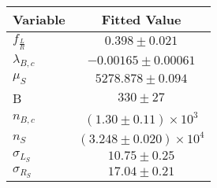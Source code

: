\begin{tabular}[t]{lc}
\hline
Variable &Fitted Value\\
\hline\hline
$f_{\frac{L}{R}}$&$0.398\pm0.021$\\
\hline
$\lambda_{B,c}$&$-0.00165\pm0.00061$\\
\hline
$\mu_S$&$5278.878\pm0.094$\\
\hline
B&$330\pm27$\\
\hline
$n_{B,c}$&$(1.30\pm0.11)\times 10^3$\\
\hline
$n_S$&$(3.248\pm0.020)\times 10^4$\\
\hline
$\sigma_{L_S}$&$10.75\pm0.25$\\
\hline
$\sigma_{R_S}$&$17.04\pm0.21$\\
\hline
\end{tabular}